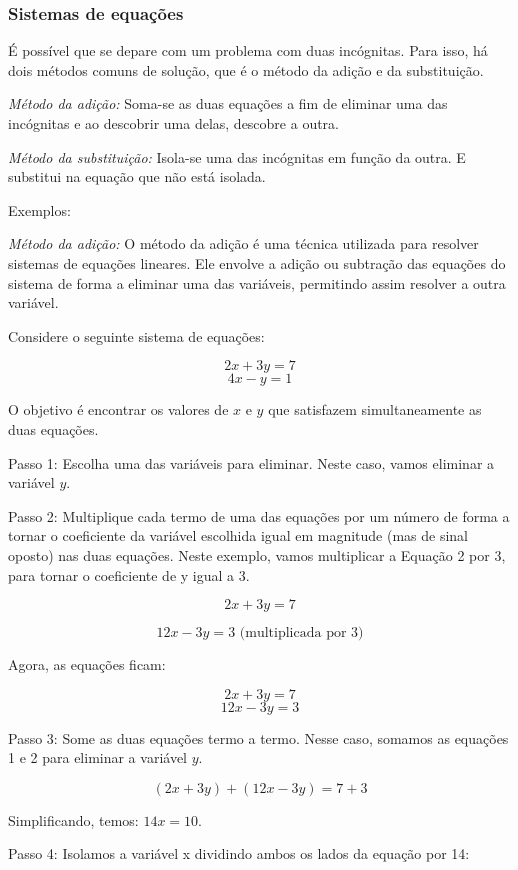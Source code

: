 {\subsubsection{Sistemas de equações}

É possível que se depare com um problema com duas incógnitas. Para isso,
há dois métodos comuns de solução, que é o método da adição e da
substituição.

\medskip \noindent \textit{Método da adição:} Soma-se as duas equações a fim de eliminar
uma das incógnitas e ao descobrir uma delas, descobre a outra.

\medskip \noindent \textit{Método da substituição:} Isola-se uma das incógnitas em função
da outra. E substitui na equação que não está isolada.

\noindent Exemplos:

\textit{Método da adição:} O método da adição é uma técnica utilizada para resolver sistemas de
equações lineares. Ele envolve a adição ou subtração das equações do
sistema de forma a eliminar uma das variáveis, permitindo assim resolver
a outra variável.

Considere o seguinte sistema de equações: 

$$2x + 3y = 7$$ 
$$4x - y = 1$$

O objetivo é encontrar os valores de $x$ e $y$ que satisfazem
simultaneamente as duas equações.

Passo 1: Escolha uma das variáveis para eliminar. Neste caso, vamos
eliminar a variável $y$.

Passo 2: Multiplique cada termo de uma das equações por um número de
forma a tornar o coeficiente da variável escolhida igual em magnitude
(mas de sinal oposto) nas duas equações. Neste exemplo, vamos
multiplicar a Equação 2 por 3, para tornar o coeficiente de y igual a 3.

$$2x + 3y = 7$$ 

$$12x - 3y = 3 \text{ (multiplicada por 3)}$$

Agora, as equações ficam: 

 $$2x + 3y = 7 $$
 $$12x - 3y = 3$$

Passo 3: Some as duas equações termo a termo. Nesse caso, somamos as
equações 1 e 2 para eliminar a variável $y$.

$$(2x + 3y) + (12x - 3y) = 7 + 3$$

Simplificando, temos: $14x = 10$.

Passo 4: Isolamos a variável x dividindo ambos os lados da equação por
14:

}

